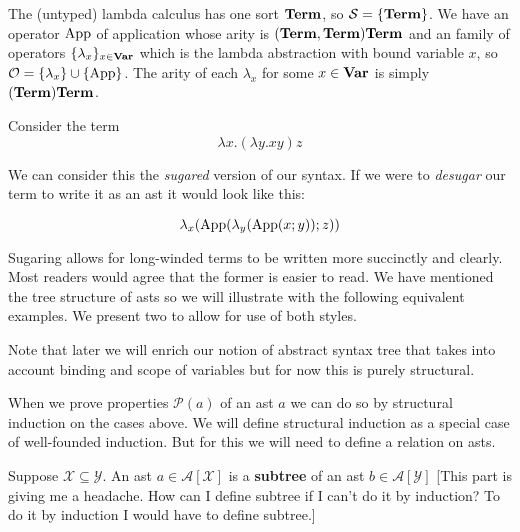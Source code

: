 \begin{example}
    The (untyped) lambda calculus has one sort $\mathbf{Term}$, so $\mathcal{S} = \{ \mathbf{Term} \} $. We have an operator $\text{App}$ of application whose arity is $(\mathbf{Term}, \mathbf{Term})\mathbf{Term}$ and an family of operators $\{\lambda_x \}_{x \in \mathbf{Var}}$ which is the lambda abstraction with bound variable $x$, so $\mathcal{O} = \{ \lambda_x \} \cup \{ \text{App} \} $. The arity of each $\lambda_x$ for some $x \in \mathbf{Var}$ is simply $(\mathbf{Term}) \mathbf{Term}$.
    
    Consider the term $$\lambda x . (\lambda y . x y)  z$$

    We can consider this the \textit{sugared} version of our syntax. If we were to \textit{desugar} our term to write it as an ast it would look like this:

    $$
        \lambda_x(\text{App}(\lambda_y(\text{App}(x ; y)); z) )
    $$

    Sugaring allows for long-winded terms to be written more succinctly and clearly. Most readers would agree that the former is easier to read. We have mentioned the tree structure of asts so we will illustrate with the following equivalent examples. We present two to allow for use of both styles.
    
    
    
\end{example}

\begin{remark}
    Note that later we will enrich our notion of abstract syntax tree that takes into account binding and scope of variables but for now this is purely structural.
\end{remark}

\begin{remark}
    When we prove properties $\mathcal{P}(a)$ of an ast $a$ we can do so by structural induction on the cases above. We will define structural induction as a special case of well-founded induction. But for this we will need to define a relation on asts.
\end{remark}

\begin{defin}
    Suppose $\mathcal{X} \subseteq \mathcal{Y}$. An ast $a \in \mathcal{A}[\mathcal{X}]$ is a \textbf{subtree} of an ast $b \in \mathcal{A}[\mathcal{Y}]$ [This part is giving me a headache. How can I define subtree if I can't do it by induction? To do it by induction I would have to define subtree.]
\end{defin}



